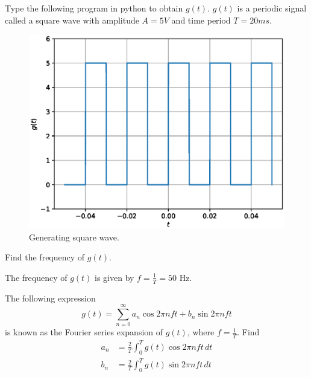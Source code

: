 
%
\begin{problem}
Type the following program in python to obtain $g(t)$.  $g(t)$ is a periodic signal called a square wave with amplitude $A = 5V$ and time period $T=20 ms$.
\end{problem}
%
\solution

\begin{figure}[!h]
\centering

\includegraphics[width=\columnwidth]{./chapter1/figs/1.1.eps}
\caption{Generating square wave.}
\label{fig:1.1}
\end{figure}
%
\begin{problem}
Find the frequency of $g(t)$.
\end{problem}
%
\solution
The frequency of $g(t)$ is given by $f = \frac{1}{T} = 50$ Hz.
\begin{problem}
The following expression
%
\begin{equation}
g(t) = \sum_{n=0}^{\infty}a_n\cos 2\pi n f t + b_n \sin 2 \pi n f t
\end{equation}
is known as the Fourier series expansion of $g(t)$, where $f = \frac{1}{T}$.  Find 
\begin{align}
a_n &= \frac{2}{T} \int_{0}^{T}g(t) \cos 2\pi nf t \, dt \\
b_n &= \frac{2}{T} \int_{0}^{T}g(t) \sin 2\pi nf t \, dt
\end{align}
\end{problem}
